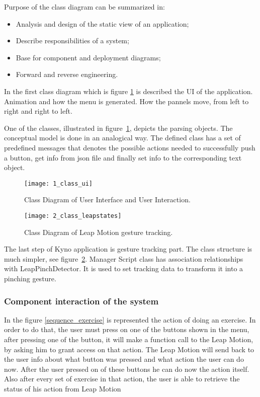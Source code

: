 Purpose of the class diagram can be summarized in:

\begin{itemize}
\item Analysis and design of the static view of an application;
\item Describe responsibilities of a system;
\item Base for component and deployment diagrams;
\item Forward and reverse engineering.
\end{itemize}

\vspace{0.2cm}

In the first class diagram which is \mbox{figure} \ref{class_ui} is described the UI of the application. Animation and how the menu is generated. How the pannels move, from left to right and right to left.

One of the classes, illustrated in \mbox{figure \ref{class_ui}}, depicts the parsing objects. The conceptual model is done in an analogical way. The defined class has a set of predefined messages that denotes the possible actions needed to successfully push a button, get info from json file and finally set info to the corresponding text object.
	



\begin{figure}[!h]
\centering
\texttt{[image: 1\_class\_ui]}
\caption{Class Diagram of User Interface and User Interaction.}\label{class_ui}
\end{figure}


\begin{figure}[!h]
\centering
\texttt{[image: 2\_class\_leapstates]}
\caption{Class Diagram of Leap Motion gesture tracking.}\label{class_leap}
\end{figure}

The last step of Kyno application is gesture tracking part. The class structure is much simpler, see \mbox{figure \ref{class_leap}}. Manager Script class has association relationships with LeapPinchDetector. It is used to set tracking data to transform it into a pinching gesture. 

\subsubsection{Component interaction of the system}
In the \mbox{figure} \ref{sequence_exercise} is represented the action of doing an exercise. In order to do that, the user must press on one of the buttons shown in the menu, after pressing one of the button, it will make a function call to the Leap Motion, by asking him to grant access on that action. The Leap Motion will send back to the user info about what button was pressed and what action the user can do now. After the user pressed on of these buttons he can do now the action itself. Also after every set of exercise in that action, the user is able to retrieve the status of his action from Leap Motion 

